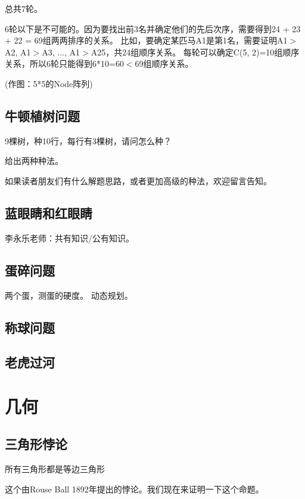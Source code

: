 \documentclass[12pt, letterpaper]{ctexrep}
\newenvironment{shadedquotation}
 {\begin{shaded*}
  \quoting[leftmargin=5pt, rightmargin=5pt, vskip=0pt]
 }
 {\endquoting
 \end{shaded*}
}
\begin{document}
总共7轮。

6轮以下是不可能的。因为要找出前3名并确定他们的先后次序，需要得到24 + 23 + 22 = 69组两两排序的关系。
比如，要确定某匹马A1是第1名，需要证明A1$>$A2, A1$>$A3, ..., A1$>$A25，共24组顺序关系。
每轮可以确定C(5, 2)=10组顺序关系，所以6轮只能得到6*10=60$<$69组顺序关系。

(作图：5*5的Node阵列)


\section{牛顿植树问题}
9棵树，种10行，每行有3棵树，请问怎么种？

给出两种种法。

如果读者朋友们有什么解题思路，或者更加高级的种法，欢迎留言告知。


\section{蓝眼睛和红眼睛}
李永乐老师：共有知识/公有知识。


\section{蛋碎问题}
两个蛋，测蛋的硬度。
动态规划。


\section{称球问题}


\section{老虎过河}




\chapter{几何}


\section{三角形悖论}
\begin{shadedquotation}
\noindent
所有三角形都是等边三角形
\end{shadedquotation}


这个由Rouse Ball 1892年提出的悖论。我们现在来证明一下这个命题。

\begin{center}

\end{center}
\end{document}

